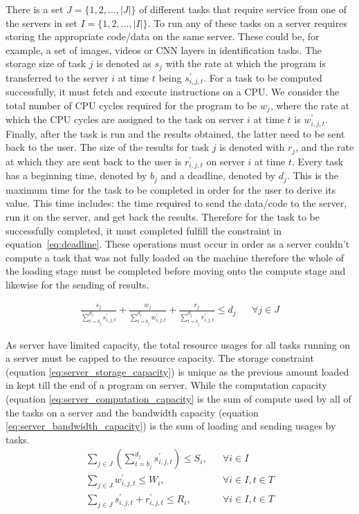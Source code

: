 \documentclass[sotoncolour]{extra/uosproject}     %
\begin{document}
There is a set $J = \{1,2,\ldots,\left| J \right|\}$ of  different tasks that require service from one of the servers in set $I = \{1,2,\ldots, \left| I \right|\}$. To run any of these tasks on a server requires storing the appropriate code/data on the same server. These could be, for example, a set of images, videos or CNN layers in identification tasks. The storage size of task $j$ is denoted as $s_j$ with the rate at which the program is transferred to the server $i$ at time $t$ being $s^{'}_{i,j,t}$. For a task to be computed successfully, it must fetch and execute instructions on a CPU. We consider the total number of CPU cycles required for the program to be $w_j$, where the rate at which the CPU cycles are assigned to the task on server $i$ at time $t$ is $w^{'}_{i,j,t}$. Finally, after the task is run and the results obtained, the latter need to be sent back to the user. The size of the results for task $j$ is denoted with $r_j$, and the rate at which they are sent back to the user is $r^{'}_{i,j,t}$ on server $i$ at time $t$. Every task has a beginning time, denoted by $b_j$ and a deadline, denoted by $d_j$. This is the maximum time for the task to be completed in order for the user to derive its value. This time includes: the time required to send the data/code to the server, run it on the server, and get back the results. Therefore for the task to be successfully completed, it must completed fulfill the constraint in equation~\eqref{eq:deadline}. These operations must occur in order as a server couldn't compute a task that was not fully loaded on the machine therefore the whole of the loading stage must be completed before moving onto the compute stage and likewise for the sending of results. 

\begin{align}
    \frac{s_j}{\sum^{d_j}_{t=b_j} s^{'}_{i,j,t}} + \frac{w_j}{\sum^{d_j}_{t=b_j} w^{'}_{i,j,t}}  + \frac{r_j}{\sum^{d_j}_{t=b_j} r^{'}_{i,j,t}} \leq d_j && \forall{j \in J}  \label{eq:deadline}
\end{align}

As server have limited capacity, the total resource usages for all tasks running on a server must be capped to the resource capacity. The storage constraint (equation \eqref{eq:server_storage_capacity}) is unique as the previous amount loaded in kept till the end of a program on server. While the computation capacity (equation \eqref{eq:server_computation_capacity} is the sum of compute used by all of the tasks on a server and the bandwidth capacity (equation \eqref{eq:server_bandwidth_capacity}) is the sum of loading and sending usages by tasks. 
\begin{align}
    \sum_{j \in J} \left(\sum^{d_j}_{t=b_j} s^{'}_{i,j,t} \right) \leq S_i, && \forall{i \in I} \label{eq:server_storage_capacity} \\
    \sum_{j \in J} w^{'}_{i,j,t} \leq W_i, && \forall{i \in I, t \in T} \label{eq:server_computation_capacity} \\
    \sum_{j \in J} s^{'}_{i,j,t} + r^{'}_{i,j,t} \leq R_i, && \forall{i \in I, t \in T} \label{eq:server_bandwidth_capacity} \\
\end{align}
\end{document}
